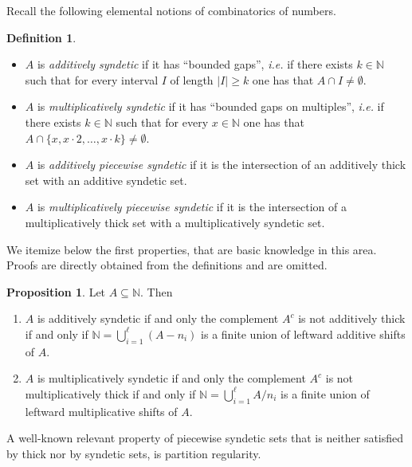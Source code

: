 \documentclass[a4paper,oneside]{article}
\newcommand{\N}{\mathbb{N}}
\theoremstyle{definition}
\newtheorem{proposition}[theorem]{Proposition}
\newtheorem{definition}[theorem]{Definition}
\theoremstyle{named}
\begin{document}
Recall the following elemental notions of combinatorics of numbers.

\begin{definition}
\

\begin{itemize}
\item 
$A$ is \emph{additively syndetic} if it has ``bounded gaps'',
\emph{i.e.} if there exists $k\in\N$ such that for every interval $I$
of length $|I|\ge k$ one has that $A\cap I\ne\emptyset$.

\item 
$A$ is \emph{multiplicatively syndetic} if it has ``bounded gaps on multiples'',
\emph{i.e.} if there exists $k\in\N$ such that for every $x\in\N$ 
one has that $A\cap\{x, x\cdot 2,\ldots,x\cdot k\}\ne\emptyset$.

\item 
$A$ is \emph{additively piecewise syndetic} 
if it is the intersection of an additively thick set with
an additive syndetic set.

\item 
$A$ is \emph{multiplicatively piecewise syndetic} 
if it is the intersection of a multiplicatively thick set with
a multiplicatively syndetic set.
\end{itemize}
\end{definition}

We itemize below the first properties, that are basic knowledge in this area.
Proofs are directly obtained from the definitions and are omitted.

\begin{proposition}
Let $A\subseteq\N$. Then

\begin{enumerate}
\item
$A$ is additively syndetic if and only the complement $A^c$ is not additively thick
if and only if $\N=\bigcup_{i=1}^\ell (A-n_i)$ is a finite union of
leftward additive shifts of $A$.

\item
$A$ is multiplicatively syndetic if and only the complement $A^c$ is not multiplicatively thick
if and only if $\N=\bigcup_{i=1}^\ell A/n_i$ is a finite union of
leftward multiplicative shifts of $A$.
\end{enumerate}
\end{proposition}

A well-known relevant property of piecewise syndetic sets that is neither satisfied
by thick nor by syndetic sets, is partition regularity.
\end{document}
